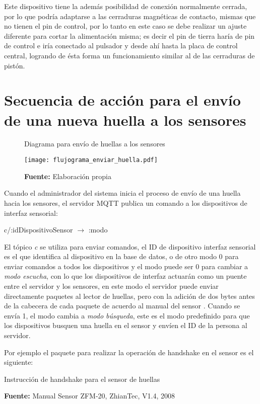 \documentclass[../principal]{subfiles}
\begin{document}
  Este dispositivo tiene la además posibilidad de conexión normalmente cerrada, por lo que podría adaptarse a las cerraduras magnéticas de contacto, mismas que no tienen el pin de control, por lo tanto en este caso se debe realizar un ajuste diferente para cortar la alimentación misma; es decir el pin de tierra haría de pin de control e iría conectado al pulsador y desde ahí hasta la placa de control central, logrando de ésta forma un funcionamiento similar al de las cerraduras de pistón.

  \section{Secuencia de acción para el envío de una nueva huella a los sensores}

  \begin{figure}[H]
    \centering
    \caption{Diagrama para envío de huellas a los sensores}
    \texttt{[image: flujograma\_enviar\_huella.pdf]}
    \caption*{\textbf{Fuente:} Elaboración propia}
    \label{fig:flujo_envio_huella}
  \end{figure}

  Cuando el administrador del sistema inicia el proceso de envío de una huella hacia los sensores, el servidor MQTT publica un comando a los dispositivos de interfaz sensorial:

  \begin{center}
    c/:idDispositivoSensor \quad $ \rightarrow $ \quad :modo
  \end{center}

  El tópico \textit{c} se utiliza para enviar comandos, el ID de dispositivo interfaz sensorial es el que identifica al dispositivo en la base de datos, o de otro modo 0 para enviar comandos a todos los dispositivos y el modo puede ser 0 para cambiar a \textit{modo escucha}, con lo que los dispositivos de interfaz actuarán como un puente entre el servidor y los sensores, en este modo el servidor puede enviar directamente paquetes al lector de huellas, pero con la adición de dos bytes antes de la cabecera de cada paquete de acuerdo al manual del sensor \cite{manual:fingerprint_ZFM-20}. Cuando se envía 1, el modo cambia a \textit{modo búsqueda}, este es el modo predefinido para que los dispositivos busquen una huella en el sensor y envíen el ID de la persona al servidor.

  Por ejemplo el paquete para realizar la operación de handshake en el sensor es el siguiente:

  \begin{table}[H]
    \centering
    \caption{Instrucción de handshake para el sensor de huellas}
    
    \caption*{\textbf{Fuente:} Manual Sensor ZFM-20, ZhianTec, V1.4, 2008 \cite{manual:fingerprint_ZFM-20}}
  \end{table}
\end{document}
